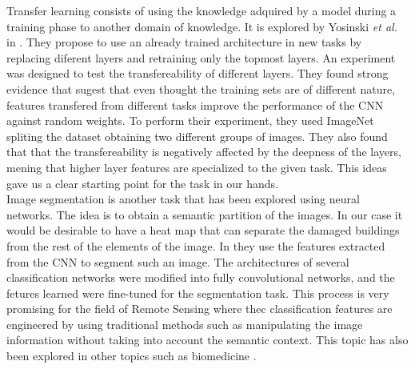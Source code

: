 Transfer learning consists of using the knowledge adquired by a model during a training phase to another domain of knowledge. It is explored by Yosinski \textit{et al.} in \cite{DBLP:journals/corr/YosinskiCBL14}. They propose to use an already trained architecture in new tasks by replacing diferent layers and retraining only the topmost layers. An experiment was designed to test the transfereability of different layers. They found strong evidence that sugest that even thought the training sets are of different nature, features transfered from different tasks improve the performance of the CNN against random weights. To perform their experiment, they used ImageNet \cite{Deng09imagenet:a} spliting the dataset obtaining two different groups of images. They also found that that the transfereability is negatively affected by the deepness of the layers, mening that higher layer features are specialized to the given task. This ideas gave us a clear starting point for the task in our hands.\\


Image segmentation is another task that has been explored using neural networks. The idea is to obtain a semantic partition of the images. In our case it would be desirable to have a heat map that can separate the damaged buildings from the rest of the elements of the image. In \cite{DBLP:journals/corr/LongSD14} they use the features extracted from the CNN to segment such an image. The architectures of several classification networks were modified into fully convolutional networks, and the fetures learned were fine-tuned for the segmentation task. This process is very promising for the field of Remote Sensing where thec classification features are engineered by using traditional methods such as manipulating the image information without taking into account the semantic context. This topic has also been explored in other topics such as biomedicine \cite{DBLP:journals/corr/RonnebergerFB15}.\\

